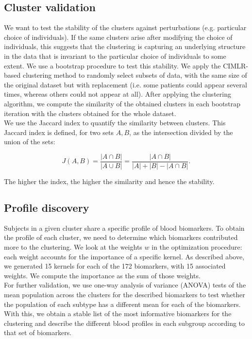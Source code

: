 \subsection{Cluster validation}

We want to test the stability of the clusters against perturbations (e.g. particular choice of individuals). If the same clusters arise after modifying the choice of individuals, this suggests that the clustering is capturing an underlying structure in the data that is invariant to the particular choice of individuals to some extent. We use a bootstrap procedure to test this stability. We apply the CIMLR-based clustering method to randomly select subsets of data, with the same size of the original dataset but with replacement (i.e. some patients could appear several times, whereas others could not appear at all). After applying the clustering algorithm, we compute the similarity of the obtained clusters in each bootstrap iteration with the clusters obtained for the whole dataset. \\

We use the Jaccard index to quantify the similarity between clusters. This Jaccard index is defined, for two sets $A,B$, as the intersection divided by the union of the sets:

\begin{equation}
J(A,B) = {\frac{|A \cap B|}{|A \cup B|}} = {\frac{|A \cap B|}{|A| + |B| - |A \cap B|}}.
\end{equation}

The higher the index, the higher the similarity and hence the stability.

\subsection{Profile discovery}

Subjects in a given cluster share a specific profile of blood biomarkers. To obtain the profile of each cluster, we need to determine which biomarkers contributed more to the clustering. We look at the weights $w$ in the optimization procedure: each weight accounts for the importance of a specific kernel. As described above, we generated 15 kernels for each of the 172 biomarkers, with 15 associated weights. We compute the importance as the sum of those weights. \\

For further validation, we use one-way analysis of variance (ANOVA) tests of the mean population across the clusters for the described biomarkers to test whether the population of each subtype has a different mean for each of the biomarkers. With this, we obtain a stable list of the most informative biomarkers for the clustering and describe the different blood profiles in each subgroup according to that set of biomarkers. \\

